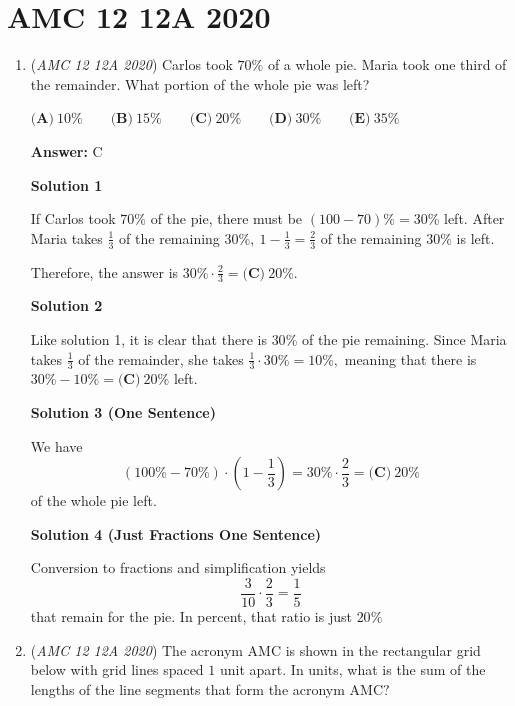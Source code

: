 \section{AMC 12 12A 2020}
        \begin{enumerate}
        	\item (\textit{AMC 12 12A 2020}) Carlos took $70\%$ of a whole pie. Maria took one third of the remainder. What portion of the whole pie was left?


 $\textbf{(A)}\ 10\%\qquad\textbf{(B)}\ 15\%\qquad\textbf{(C)}\ 20\%\qquad\textbf{(D)}\ 30\%\qquad\textbf{(E)}\ 35\%$

 \textbf{Answer: }C



\textbf{Solution 1}

If Carlos took $70\%$ of the pie, there must be $(100 - 70)\% = 30\%$ left. After Maria takes $\frac{1}{3}$ of the remaining $30\%, \ 1 - \frac{1}{3} = \frac{2}{3}$ of the remaining $30\%$ is left.

 Therefore, the answer is $30\% \cdot \frac{2}{3} = \boxed{\textbf{(C)}\ 20\%}.$




\textbf{Solution 2}

Like solution 1, it is clear that there is $30\%$ of the pie remaining. Since Maria takes $\frac{1}{3}$ of the remainder, she takes $\frac{1}{3} \cdot 30\% = 10\%,$ meaning that there is $30\% - 10\% = \boxed{\textbf{(C)}\ 20\%}$ left.

 



\textbf{Solution 3 (One Sentence)}

We have 
 \[\left(100\%-70\%\right)\cdot\left(1-\frac13\right)=30\%\cdot\frac23=\boxed{\textbf{(C)}\ 20\%}\] of the whole pie left.

 



\textbf{Solution 4 (Just Fractions One Sentence)}

Conversion to fractions and simplification yields 
 \[\frac{3}{10} \cdot \frac{2}{3} = \frac{1}{5}\] that remain for the pie. In percent, that ratio is just $\boxed{20 \%}$



	\item (\textit{AMC 12 12A 2020}) The acronym AMC is shown in the rectangular grid below with grid lines spaced $1$ unit apart. In units, what is the sum of the lengths of the line segments that form the acronym AMC$?$


\end{enumerate}
